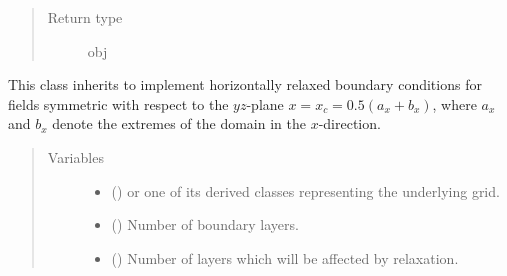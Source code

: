 \documentclass[letterpaper,10pt,english]{sphinxmanual}
\begin{document}
\begin{fulllineitems}
\begin{fulllineitems}
\begin{quote}
\begin{description}
\item[{Return type}] \leavevmode
obj

\end{description}\end{quote}

\end{fulllineitems}


\end{fulllineitems}


\begin{fulllineitems}
\label{\detokenize{api:dycore.horizontal_boundary_relaxed.RelaxedSymmetricYZ}}
This class inherits {\hyperref[\detokenize{api:dycore.horizontal_boundary_relaxed.Relaxed}]{}} to implement horizontally relaxed boundary conditions
for fields symmetric with respect to the \(yz\)-plane \(x = x_c = 0.5 (a_x + b_x)\),
where \(a_x\) and \(b_x\) denote the extremes of the domain in the \(x\)-direction.
\begin{quote}\begin{description}
\item[{Variables}] \leavevmode\begin{itemize}
\item {} 
 () \textendash{}  or one of its derived classes representing the underlying grid.

\item {} 
{\hyperref[\detokenize{api:dycore.prognostic_isentropic.PrognosticIsentropic.nb}]{}} () \textendash{} Number of boundary layers.

\item {} 
 () \textendash{} Number of layers which will be affected by relaxation.

\end{itemize}

\end{description}\end{quote}


\end{fulllineitems}
\end{document}
